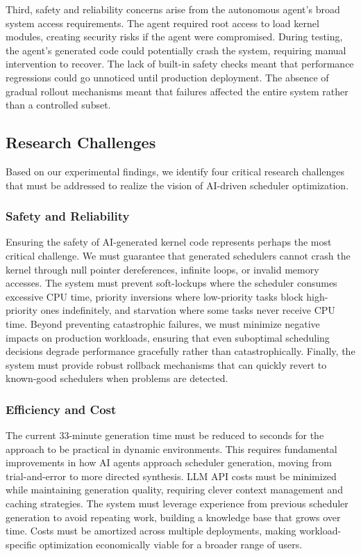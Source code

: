 Third, safety and reliability concerns arise from the autonomous agent's broad system access requirements. The agent required root access to load kernel modules, creating security risks if the agent were compromised. During testing, the agent's generated code could potentially crash the system, requiring manual intervention to recover. The lack of built-in safety checks meant that performance regressions could go unnoticed until production deployment. The absence of gradual rollout mechanisms meant that failures affected the entire system rather than a controlled subset.

\subsection{Research Challenges}

Based on our experimental findings, we identify four critical research challenges that must be addressed to realize the vision of AI-driven scheduler optimization.

\subsubsection{Safety and Reliability}

Ensuring the safety of AI-generated kernel code represents perhaps the most critical challenge. We must guarantee that generated schedulers cannot crash the kernel through null pointer dereferences, infinite loops, or invalid memory accesses. The system must prevent soft-lockups where the scheduler consumes excessive CPU time, priority inversions where low-priority tasks block high-priority ones indefinitely, and starvation where some tasks never receive CPU time. Beyond preventing catastrophic failures, we must minimize negative impacts on production workloads, ensuring that even suboptimal scheduling decisions degrade performance gracefully rather than catastrophically. Finally, the system must provide robust rollback mechanisms that can quickly revert to known-good schedulers when problems are detected.

\subsubsection{Efficiency and Cost}

The current 33-minute generation time must be reduced to seconds for the approach to be practical in dynamic environments. This requires fundamental improvements in how AI agents approach scheduler generation, moving from trial-and-error to more directed synthesis. LLM API costs must be minimized while maintaining generation quality, requiring clever context management and caching strategies. The system must leverage experience from previous scheduler generation to avoid repeating work, building a knowledge base that grows over time. Costs must be amortized across multiple deployments, making workload-specific optimization economically viable for a broader range of users.

